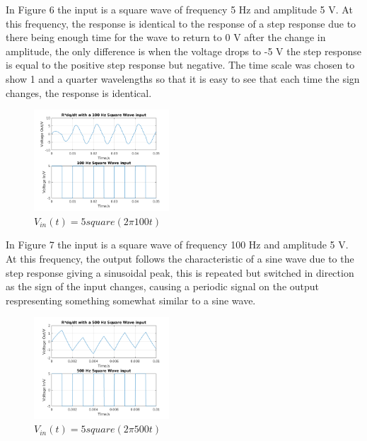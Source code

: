 \documentclass[11pt,a4paper]{article}
\begin{document}
\vspace{3mm}In Figure 6 the input is a square wave of frequency 5 Hz and amplitude 5 V. At this frequency, the response is identical to the response of a step response due to there being enough time for the wave to return to 0 V after the change in amplitude, the only difference is when the voltage drops to -5 V the step response is equal to the positive step response but negative. The time scale was chosen to show 1 and a quarter wavelengths so that it is easy to see that each time the sign changes, the response is identical.

\begin{figure}
    \vspace{-40mm}
  		\includegraphics[width=0.45\textwidth]{Ex3_Figs/100Squ1.png}
	\vspace{-6mm}
  	\caption{$V_{in}(t)= 5square(2 \pi 100t)$}
  	\label{fig:ex3g6}
\end{figure}

\vspace{5mm}In Figure 7 the input is a square wave of frequency 100 Hz and amplitude 5 V. At this frequency, the output follows the characteristic of a sine wave due to the step response giving a sinusoidal peak, this is repeated but switched in direction as the sign of the input changes, causing a periodic signal on the output respresenting something somewhat similar to a sine wave.

\begin{figure}
    \vspace{-5mm}
  		\includegraphics[width=0.45\textwidth]{Ex3_Figs/500Squ1.png}
	\vspace{-6mm}
  	\caption{$V_{in}(t)= 5square(2 \pi 500t)$}
  	\label{fig:ex3g7}
\end{figure}
\end{document}
